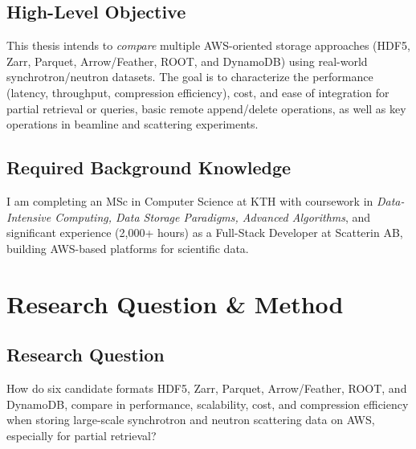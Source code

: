 \documentclass{article}
\begin{document}
\subsection{High-Level Objective}
This thesis intends to \emph{compare} multiple AWS-oriented storage approaches (HDF5, Zarr, Parquet, Arrow/Feather, ROOT, and DynamoDB) using real-world synchrotron/neutron datasets. The goal is to characterize the performance (latency, throughput, compression efficiency), cost, and ease of integration for partial retrieval or queries, basic remote append/delete operations, as well as key operations in beamline and scattering experiments.


\subsection{Required Background Knowledge}
I am completing an MSc in Computer Science at KTH with coursework in \emph{Data-Intensive Computing, Data Storage Paradigms, Advanced Algorithms}, and significant experience (2,000+ hours) as a Full-Stack Developer at Scatterin AB, building AWS-based platforms for scientific data.






\section{Research Question \& Method}

\subsection{Research Question}
How do six candidate formats HDF5, Zarr, Parquet, Arrow/Feather, ROOT, and DynamoDB, compare in performance, scalability, cost, and compression efficiency when storing large-scale synchrotron and neutron scattering data on AWS, especially for partial retrieval?
\end{document}
